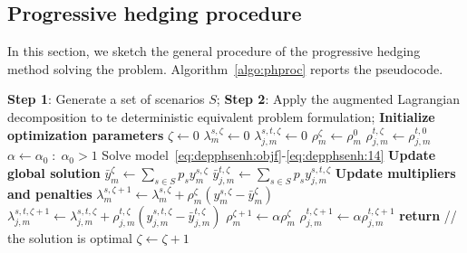 \documentclass[a4paper,11pt]{article}
\begin{document}
	\subsection{Progressive hedging procedure}
	In this section, we sketch the general procedure of the progressive hedging method solving the problem.
	Algorithm~\ref{algo:phproc} reports the pseudocode.
	\begin{algorithm}[!h]
	\small
	\caption{Progressive hedging procedure}\label{algo:phproc}
	\begin{algorithmic}[1]
		\State \textbf{Step 1}: Generate a set of scenarios $ S$;
		\State \textbf{Step 2}: Apply the augmented Lagrangian decomposition to te deterministic equivalent problem formulation;
		\State 
		\State \textbf{Initialize optimization parameters}
		\State $ \zeta \gets 0$ 
		\State $ \lambda^{s,\zeta}_{m} \gets 0$
		\State $ \lambda^{s,t,\zeta}_{j,m} \gets 0$
		\State $ \rho^{\zeta}_{m} \gets \rho^{0}_{m}$
		\State $ \rho^{t,\zeta}_{j,m} \gets \rho^{t,0}_{j,m}$
		\State $ \alpha \gets \alpha_0 \; : \; \alpha_0 > 1$
		\State 
		\State 
		\State Solve model~\eqref{eq:depphsenh:objf}-\eqref{eq:depphsenh:14}
		\EndFor
		\State 
		\State \textbf{Update global solution}
		\State $ \bar{y}^\zeta_{m} \gets \sum\limits_{s \in S} p_s y^{s, \zeta}_{m}$
		\State $ \bar{y}^{t,\zeta}_{j,m} \gets \sum\limits_{s \in S}p_s y^{s,t, \zeta}_{j,m}$
		\State 
		\State \textbf{Update multipliers and penalties}
		\State $ \lambda^{s,\zeta + 1}_{m} \gets \lambda^{s,\zeta}_{m} + \rho^{\zeta}_{m} \left( y^{s, \zeta}_{m} - \bar{y}^\zeta_{m} \right) $
		\State $ \lambda^{s,t,\zeta + 1}_{j,m} \gets \lambda^{s,t,\zeta}_{j,m} + \rho^{t,\zeta}_{j,m} \left( y^{s,t, \zeta}_{j,m} - \bar{y}^{t,\zeta}_{j,m} \right)$
		\State $ \rho^{\zeta + 1}_{m} \gets \alpha \rho^{\zeta}_{m}$
		\State $ \rho^{t,\zeta + 1}_{j,m} \gets \alpha \rho^{t,\zeta + 1}_{j,m}$
		\State 
		\State \textbf{return} \hspace{2cm} // the solution is optimal
		\EndIf
		\State 
		\State $ \zeta \gets \zeta + 1$
		\EndWhile
		\State 
		\EndProcedure
	\end{algorithmic}
	\end{algorithm}
	
\end{document}
